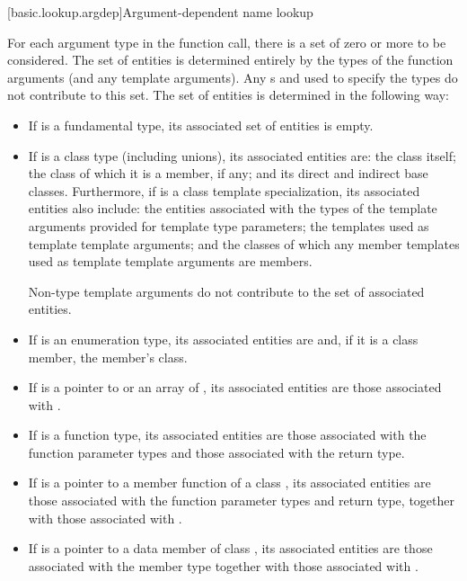 \documentclass{wg21}
\begin{document}
[basic.lookup.argdep]{Argument-dependent name lookup}%

\pnum
For each argument type  in the function call,
there is a set of zero or more 
to be considered.
The set of entities is determined entirely by
the types of the function arguments
(and any  template arguments).
Any s and 
used to specify the types
do not contribute to this set.
The set of entities
is determined in the following way:
\begin{itemize}
    \item If  is a fundamental type, its associated set of
    entities is empty.

    \item If  is a class type (including unions),
    its associated entities are:
    the class itself;
    the class of which it is a member, if any;
    and its direct and indirect base classes.
    Furthermore, if  is a class template specialization,
    its associated entities also include:
    the entities
    associated with the types of the template arguments
    provided for template type parameters;
    the templates used as template template arguments; and
    the classes of which any member templates used as template template
    arguments are members.
    \begin{note}
        Non-type template arguments do not
        contribute to the set of associated entities.
    \end{note}

    \item If  is an enumeration type,
    its associated entities are 
    and, if it is a class member, the member's class.

    \item If  is a pointer to  or an array of ,
    its associated entities are those associated with .

    \item If  is a function type, its associated
    entities are those associated with the function parameter types and those
    associated with the return type.

    \item If  is a pointer to a member function of a class
    , its associated entities are those associated
    with the function parameter types and return type, together with those
    associated with .

    \item If  is a pointer to a data member of class , its
    associated entities are those associated with the member
    type together with those associated with .
\end{itemize}
\end{document}

